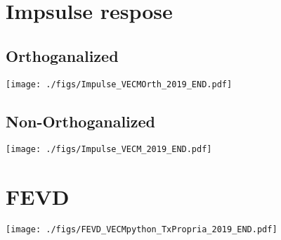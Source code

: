 \documentclass[11pt]{article}
\begin{document}
\section{Impsulse respose}
\label{sec:org94c1cd4}

\subsection{Orthoganalized}
\label{sec:org24a4177}

\begin{center}
\texttt{[image: ./figs/Impulse\_VECMOrth\_2019\_END.pdf]}
\end{center}

\subsection{Non-Orthoganalized}
\label{sec:org53b722e}

\begin{center}
\texttt{[image: ./figs/Impulse\_VECM\_2019\_END.pdf]}
\end{center}

\section{FEVD}
\label{sec:org5d4a93f}
\begin{center}
\texttt{[image: ./figs/FEVD\_VECMpython\_TxPropria\_2019\_END.pdf]}
\end{center}
\end{document}
